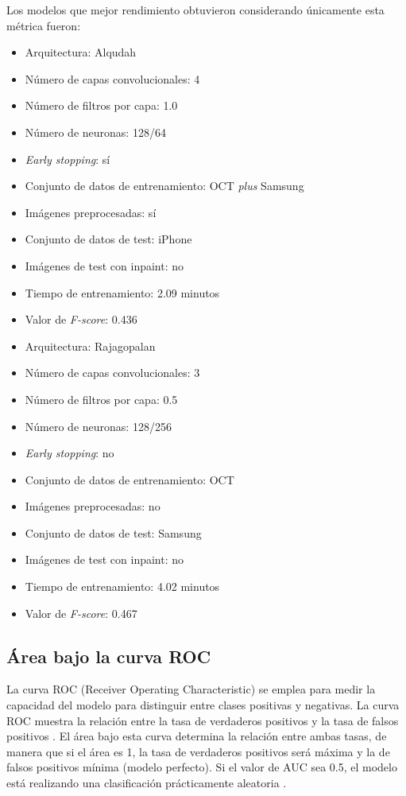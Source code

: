 Los modelos que mejor rendimiento obtuvieron considerando únicamente esta métrica fueron:

\begin{itemize}
    \item Arquitectura: Alqudah
    \item Número de capas convolucionales: 4
    \item Número de filtros por capa: 1.0
    \item Número de neuronas: 128/64
    \item \textit{Early stopping}: sí
    \item Conjunto de datos de entrenamiento: OCT \textit{plus} Samsung
    \item Imágenes preprocesadas: sí
    \item Conjunto de datos de test: iPhone
    \item Imágenes de test con inpaint: no
    \item Tiempo de entrenamiento: 2.09 minutos
    \item Valor de \textit{F-score}: 0.436
\end{itemize}

\begin{itemize}
    \item Arquitectura: Rajagopalan
    \item Número de capas convolucionales: 3
    \item Número de filtros por capa: 0.5
    \item Número de neuronas: 128/256
    \item \textit{Early stopping}: no
    \item Conjunto de datos de entrenamiento: OCT
    \item Imágenes preprocesadas: no
    \item Conjunto de datos de test: Samsung
    \item Imágenes de test con inpaint: no
    \item Tiempo de entrenamiento: 4.02 minutos
    \item Valor de \textit{F-score}: 0.467
\end{itemize}

\subsection{Área bajo la curva ROC}

La curva ROC (Receiver Operating Characteristic) se emplea para medir la capacidad del modelo para distinguir entre clases positivas y negativas. La curva ROC muestra la relación entre la tasa de verdaderos positivos y la tasa de falsos positivos \cite{sklearn:auc}. El área bajo esta curva determina la relación entre ambas tasas, de manera que si el área es 1, la tasa de verdaderos positivos será máxima y la de falsos positivos mínima (modelo perfecto). Si el valor de AUC sea 0.5, el modelo está realizando una clasificación prácticamente aleatoria \cite{sklearn:auc, metrics:inbal}.

